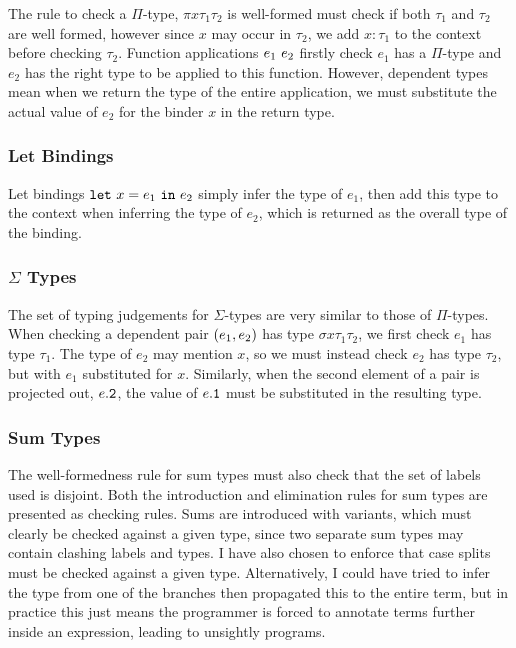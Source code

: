 \documentclass[12pt,a4paper,twoside]{report}
\begin{document}
The rule to check a \(\Pi\)-type, \(\pi{x}{\tau_1}{\tau_2}\) is well-formed must check if both \(\tau_1\) and \(\tau_2\) are well formed, however since \(x\) may occur in \(\tau_2\), we add \(x : \tau_1\) to the context before checking \(\tau_2\).
Function applications \(e_1\ e_2\) firstly check \(e_1\) has a \(\Pi\)-type and \(e_2\) has the right type to be applied to this function.
However, dependent types mean when we return the type of the entire application, we must substitute the actual value of \(e_2\) for the binder \(x\) in the return type.

\subsubsection{Let Bindings}

Let bindings \(\mathtt{let}\ x = e_1\ \mathtt{in}\ e_2\) simply infer the type of \(e_1\), then add this type to the context when inferring the type of \(e_2\), which is returned as the overall type of the binding.

\subsubsection{\(\Sigma\) Types}

The set of typing judgements for \(\Sigma\)-types are very similar to those of \(\Pi\)-types.
When checking a dependent pair \((e_1, e_2)\) has type \(\sigma{x}{\tau_1}{\tau_2}\), we first check \(e_1\) has type \(\tau_1\).
The type of \(e_2\) may mention \(x\), so we must instead check \(e_2\) has type \(\tau_2\), but with \(e_1\) substituted for \(x\).
Similarly, when the second element of a pair is projected out, \(e\mathtt{.2}\), the value of \(e\mathtt{.1}\) must be substituted in the resulting type.

\subsubsection{Sum Types}

The well-formedness rule for sum types must also check that the set of labels used is disjoint.
Both the introduction and elimination rules for sum types are presented as checking rules.
Sums are introduced with variants, which must clearly be checked against a given type, since two separate sum types may contain clashing labels and types.
I have also chosen to enforce that case splits must be checked against a given type.
Alternatively, I could have tried to infer the type from one of the branches then propagated this to the entire term, but in practice this just means the programmer is forced to annotate terms further inside an expression, leading to unsightly programs.
\end{document}
